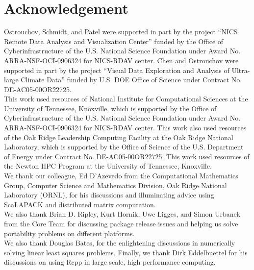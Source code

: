 
\section*{Acknowledgement}

Ostrouchov, Schmidt, and Patel were supported in part by the project
``NICS Remote Data Analysis and Visualization Center''
funded by the Office of Cyberinfrastructure of the
U.S. National Science Foundation
under Award No. ARRA-NSF-OCI-0906324 for NICS-RDAV center.
Chen and Ostrouchov were supported in part by the project
``Visual Data Exploration and Analysis of Ultra-large Climate Data''
funded by U.S. DOE Office of Science
under Contract No. DE-AC05-00OR22725.
\\

This work used resources of National Institute for Computational
Sciences at the University of Tennessee, Knoxville, which is supported
by the Office of Cyberinfrastructure of the U.S. National Science Foundation
under Award No. ARRA-NSF-OCI-0906324 for NICS-RDAV center.
This work also used resources of the Oak Ridge Leadership Computing Facility
at the Oak Ridge National Laboratory, which is supported by the Office of
Science of the U.S. Department of Energy under Contract No. DE-AC05-00OR22725.
This work used resources of the Newton HPC Program at the University of Tennessee, 
Knoxville. 
\\

We thank our colleague, Ed D'Azevedo
from the Computational Mathematics Group,
Computer Science and Mathematics Division,
Oak Ridge National Laboratory (ORNL),
for his discussions and illuminating advice using 
ScaLAPACK and distributed matrix computation.
\\

We also thank Brian D. Ripley, Kurt Hornik, Uwe Ligges, and Simon Urbanek
from the  Core Team for discussing package release issues and
helping us solve portability problems on different platforms.
\\

We also thank Douglas Bates, for the enlightening discussions in numerically solving linear least squares problems.  Finally, we thank Dirk Eddelbuettel for his discussions on using Rcpp in large scale, high performance computing.
